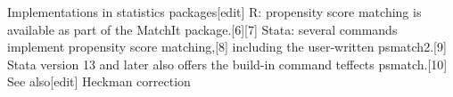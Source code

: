 Implementations in statistics packages[edit]
R: propensity score matching is available as part of the MatchIt package.[6][7]
Stata: several commands implement propensity score matching,[8] including the user-written psmatch2.[9] Stata version 13 and later also offers the build-in command teffects psmatch.[10]
See also[edit]
Heckman correction
